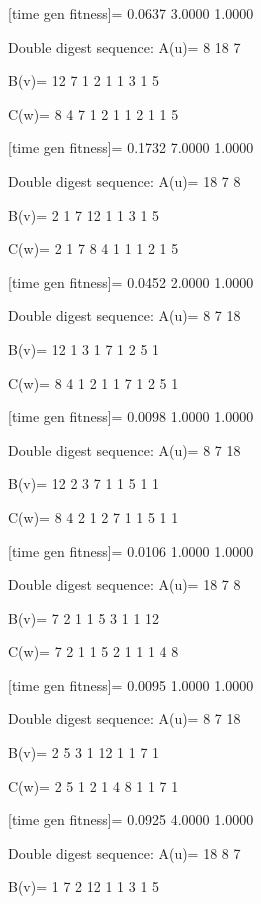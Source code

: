 [time gen fitness]=
    0.0637    3.0000    1.0000

Double digest sequence:
A(u)=
     8    18     7

B(v)=
    12     7     1     2     1     1     3     1     5

C(w)=
     8     4     7     1     2     1     1     2     1     1     5

[time gen fitness]=
    0.1732    7.0000    1.0000

Double digest sequence:
A(u)=
    18     7     8

B(v)=
     2     1     7    12     1     1     3     1     5

C(w)=
     2     1     7     8     4     1     1     1     2     1     5

[time gen fitness]=
    0.0452    2.0000    1.0000

Double digest sequence:
A(u)=
     8     7    18

B(v)=
    12     1     3     1     7     1     2     5     1

C(w)=
     8     4     1     2     1     1     7     1     2     5     1

[time gen fitness]=
    0.0098    1.0000    1.0000

Double digest sequence:
A(u)=
     8     7    18

B(v)=
    12     2     3     7     1     1     5     1     1

C(w)=
     8     4     2     1     2     7     1     1     5     1     1

[time gen fitness]=
    0.0106    1.0000    1.0000

Double digest sequence:
A(u)=
    18     7     8

B(v)=
     7     2     1     1     5     3     1     1    12

C(w)=
     7     2     1     1     5     2     1     1     1     4     8

[time gen fitness]=
    0.0095    1.0000    1.0000

Double digest sequence:
A(u)=
     8     7    18

B(v)=
     2     5     3     1    12     1     1     7     1

C(w)=
     2     5     1     2     1     4     8     1     1     7     1

[time gen fitness]=
    0.0925    4.0000    1.0000

Double digest sequence:
A(u)=
    18     8     7

B(v)=
     1     7     2    12     1     1     3     1     5


